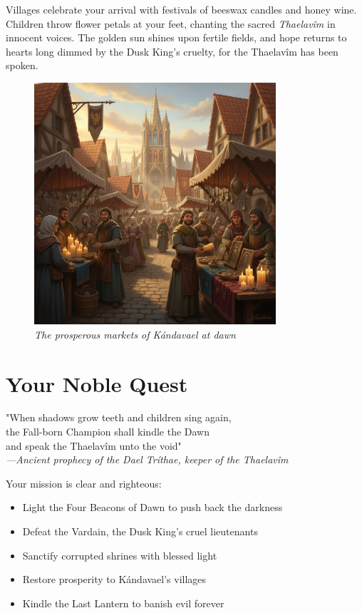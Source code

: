 \documentclass[11pt,a4paper,twoside]{book}
\begin{document}
Villages celebrate your arrival with festivals of beeswax candles and honey wine. Children throw flower petals at your feet, chanting the sacred \textit{Thaelavîm} in innocent voices. The golden sun shines upon fertile fields, and hope returns to hearts long dimmed by the Dusk King's cruelty, for the Thaelavîm has been spoken.

\begin{figure}[h]
\centering
\includegraphics[width=0.8\textwidth]{images/market_dawn_2025-09-03T22-29-52-092Z_1.png}
\caption*{\textit{The prosperous markets of Kándavael at dawn}}
\end{figure}

\section{Your Noble Quest}

\begin{tcolorbox}[heroicbox={The Prophecy}]
\centering
\displayfont\large
"When shadows grow teeth and children sing again,\\
the Fall-born Champion shall kindle the Dawn\\
and speak the Thaelavîm unto the void"\\
\normalfont
\vspace{1em}
\textit{—Ancient prophecy of the Dael Tríthae, keeper of the Thaelavîm}
\end{tcolorbox}

Your mission is clear and righteous:
\begin{itemize}
    \item Light the Four Beacons of Dawn to push back the darkness
    \item Defeat the Vardain, the Dusk King's cruel lieutenants  
    \item Sanctify corrupted shrines with blessed light
    \item Restore prosperity to Kándavael's villages
    \item Kindle the Last Lantern to banish evil forever
\end{itemize}
\end{document}
